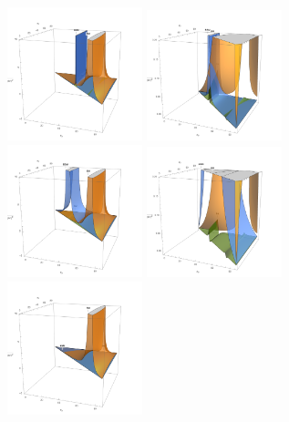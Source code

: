 \begin{figure}[ht]
    \centering
    \includegraphics[width=0.35\textwidth]{chapters/Physics/sectionBSM/figures/2HDM_120_10.png}
    \includegraphics[width=0.35\textwidth]{chapters/Physics/sectionBSM/figures/zoom_2HDM_140_10.png}
    \includegraphics[width=0.35\textwidth]{chapters/Physics/sectionBSM/figures/2HDM_140_40.png}
    \includegraphics[width=0.35\textwidth]{chapters/Physics/sectionBSM/figures/zoom_2HDM_140_40.png}
    \includegraphics[width=0.35\textwidth]{chapters/Physics/sectionBSM/figures/2HDM_200_40.png}

\end{figure}
